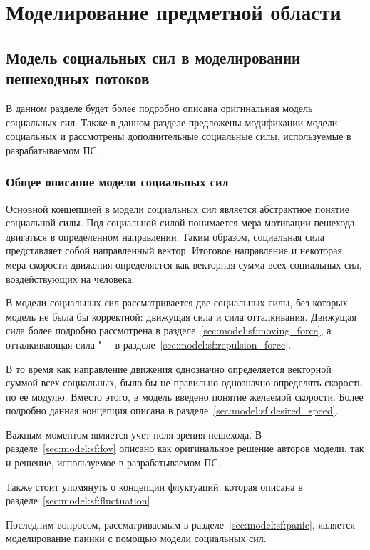 \section{Моделирование предметной области}
\label{sec:model}

\subsection{Модель социальных сил в моделировании пешеходных потоков}
\label{sec:model:sf}

В данном разделе будет более подробно описана оригинальная модель социальных сил.
Также в данном разделе предложены модификации модели социальных и рассмотрены дополнительные социальные силы, используемые в разрабатываемом ПС.

\subsubsection{Общее описание модели социальных сил}
\label{sec:model:sf:description}

Основной концепцией в модели социальных сил является абстрактное понятие социальной силы.
Под социальной силой понимается мера мотивации пешехода двигаться в определенном направлении.
Таким образом, социальная сила представляет собой направленный вектор.
Итоговое направление и некоторая мера скорости движения определяется как векторная сумма всех социальных сил, воздействующих на человека.

В модели социальных сил рассматривается две социальных силы, без которых модель не была бы корректной: движущая сила и сила отталкивания.
Движущая сила более подробно рассмотрена в разделе~\ref{sec:model:sf:moving_force}, а отталкивающая сила "--- в разделе~\ref{sec:model:sf:repulsion_force}.

В то время как направление движения однозначно определяется векторной суммой всех социальных, было бы не правильно однозначно определять скорость по ее модулю.
Вместо этого, в модель введено понятие желаемой скорости. Более подробно данная концепция описана в разделе~\ref{sec:model:sf:desired_speed}.

Важным моментом является учет поля зрения пешехода. В разделе~\ref{sec:model:sf:fov} описано как оригинальное решение авторов модели, так и решение, используемое в разрабатываемом ПС.

Также стоит упомянуть о концепции флуктуаций, которая описана в разделе~\ref{sec:model:sf:fluctuation}

Последним вопросом, рассматриваемым в разделе~\ref{sec:model:sf:panic}, является моделирование паники с помощью модели социальных сил.

